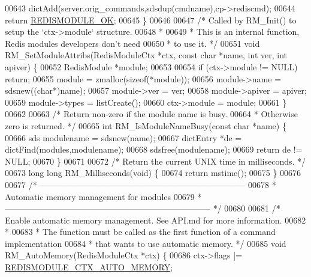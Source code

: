 \begin{DoxyCode}
{00643     dictAdd(server.orig\_commands,sdsdup(cmdname),cp->rediscmd);
00644     \textcolor{keywordflow}{return} \hyperlink{redismodule_8h_a1bc5bfd69abcd378ff52c640adc5418d}{REDISMODULE\_OK};
00645 \}
00646 
00647 \textcolor{comment}{/* Called by RM\_Init() to setup the `ctx->module` structure.}
00648 \textcolor{comment}{ *}
00649 \textcolor{comment}{ * This is an internal function, Redis modules developers don't need}
00650 \textcolor{comment}{ * to use it. */}
00651 \textcolor{keywordtype}{void} RM\_SetModuleAttribs(RedisModuleCtx *ctx, \textcolor{keyword}{const} \textcolor{keywordtype}{char} *name, \textcolor{keywordtype}{int} ver, \textcolor{keywordtype}{int} apiver) \{
00652     RedisModule *module;
00653 
00654     \textcolor{keywordflow}{if} (ctx->module != NULL) \textcolor{keywordflow}{return};
00655     module = zmalloc(\textcolor{keyword}{sizeof}(*module));
00656     module->name = sdsnew((\textcolor{keywordtype}{char}*)name);
00657     module->ver = ver;
00658     module->apiver = apiver;
00659     module->types = listCreate();
00660     ctx->module = module;
00661 \}
00662 
00663 \textcolor{comment}{/* Return non-zero if the module name is busy.}
00664 \textcolor{comment}{ * Otherwise zero is returned. */}
00665 \textcolor{keywordtype}{int} RM\_IsModuleNameBusy(\textcolor{keyword}{const} \textcolor{keywordtype}{char} *name) \{
00666     sds modulename = sdsnew(name);
00667     dictEntry *de = dictFind(modules,modulename);
00668     sdsfree(modulename);
00669     \textcolor{keywordflow}{return} de != NULL;
00670 \}
00671 
00672 \textcolor{comment}{/* Return the current UNIX time in milliseconds. */}
00673 \textcolor{keywordtype}{long} \textcolor{keywordtype}{long} RM\_Milliseconds(\textcolor{keywordtype}{void}) \{
00674     \textcolor{keywordflow}{return} mstime();
00675 \}
00676 
00677 \textcolor{comment}{/* --------------------------------------------------------------------------}
00678 \textcolor{comment}{ * Automatic memory management for modules}
00679 \textcolor{comment}{ * -------------------------------------------------------------------------- */}
00680 
00681 \textcolor{comment}{/* Enable automatic memory management. See API.md for more information.}
00682 \textcolor{comment}{ *}
00683 \textcolor{comment}{ * The function must be called as the first function of a command implementation}
00684 \textcolor{comment}{ * that wants to use automatic memory. */}
00685 \textcolor{keywordtype}{void} RM\_AutoMemory(RedisModuleCtx *ctx) \{
00686     ctx->flags |= \hyperlink{module_8c_a223998b47b49203e12aba298a7a8fd14}{REDISMODULE\_CTX\_AUTO\_MEMORY};
}
\end{DoxyCode}

